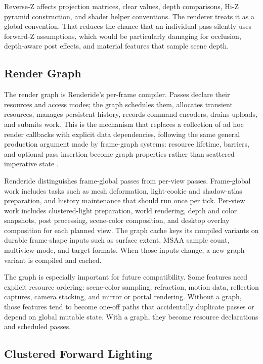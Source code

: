 \documentclass[acmtog,screen,nonacm]{acmart}
\begin{document}
Reverse-Z affects projection matrices, clear values, depth comparisons, Hi-Z pyramid construction, and shader helper conventions. The renderer treats it as a global convention. That reduces the chance that an individual pass silently uses forward-Z assumptions, which would be particularly damaging for occlusion, depth-aware post effects, and material features that sample scene depth.

\subsection{Render Graph}

The render graph is Renderide's per-frame compiler. Passes declare their resources and access modes; the graph schedules them, allocates transient resources, manages persistent history, records command encoders, drains uploads, and submits work. This is the mechanism that replaces a collection of ad hoc render callbacks with explicit data dependencies, following the same general production argument made by frame-graph systems: resource lifetime, barriers, and optional pass insertion become graph properties rather than scattered imperative state \citep{frostbiteFrameGraph,unrealRdg}.

Renderide distinguishes frame-global passes from per-view passes. Frame-global work includes tasks such as mesh deformation, light-cookie and shadow-atlas preparation, and history maintenance that should run once per tick. Per-view work includes clustered-light preparation, world rendering, depth and color snapshots, post processing, scene-color composition, and desktop overlay composition for each planned view. The graph cache keys its compiled variants on durable frame-shape inputs such as surface extent, MSAA sample count, multiview mode, and target formats. When those inputs change, a new graph variant is compiled and cached.

The graph is especially important for future compatibility. Some features need explicit resource ordering: scene-color sampling, refraction, motion data, reflection captures, camera stacking, and mirror or portal rendering. Without a graph, those features tend to become one-off paths that accidentally duplicate passes or depend on global mutable state. With a graph, they become resource declarations and scheduled passes.

\subsection{Clustered Forward Lighting}
\end{document}
